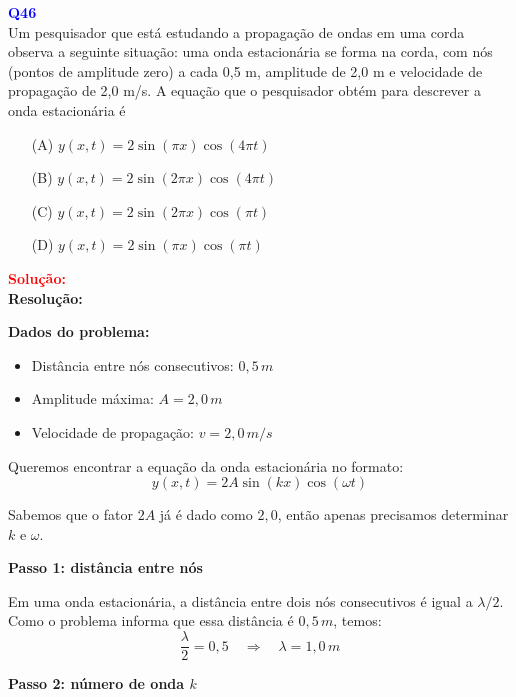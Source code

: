 \documentclass[a4paper,12pt]{article}
\begin{document}
\begin{flushleft}
\textbf{\textcolor{blue}{\Large Q46}}\\
\noindent
Um pesquisador que está estudando a propagação de ondas em uma corda observa a seguinte situação: uma
onda estacionária se forma na corda, com nós (pontos de amplitude zero) a cada 0,5 m, amplitude de 2,0 m e
velocidade de propagação de 2,0 m/s. A equação que o pesquisador obtém para descrever a onda estacionária é

\begin{itemize}
\item[(A)] $y(x,t) = 2\sin(\pi x)\cos(4\pi t)$
\item[(B)] $y(x,t) = 2\sin(2\pi x)\cos(4\pi t)$
\item[(C)] $y(x,t) = 2\sin(2\pi x)\cos(\pi t)$
\item[(D)] $y(x,t) = 2\sin(\pi x)\cos(\pi t)$
\end{itemize}

\vspace{0.5cm}

\textcolor{red}{\textbf{Solução:}}\\

\textbf{Resolução:}

\bigskip

\textbf{Dados do problema:}
\begin{itemize}
    \item Distância entre nós consecutivos: \(0{,}5\,m\)
    \item Amplitude máxima: \(A = 2,0\,m\)
    \item Velocidade de propagação: \(v = 2,0\,m/s\)
\end{itemize}

Queremos encontrar a equação da onda estacionária no formato:
\[
y(x,t) = 2A \sin(kx) \cos(\omega t)
\]

Sabemos que o fator \(2A\) já é dado como \(2,0\), então apenas precisamos determinar \(k\) e \(\omega\).

\bigskip

\textbf{Passo 1: distância entre nós}

Em uma onda estacionária, a distância entre dois nós consecutivos é igual a \(\lambda/2\).  
Como o problema informa que essa distância é \(0{,}5\,m\), temos:
\[
\frac{\lambda}{2} = 0{,}5 \quad \Longrightarrow \quad \lambda = 1,0\,m
\]

\bigskip

\textbf{Passo 2: número de onda \(k\)}


\end{flushleft}
\end{document}
